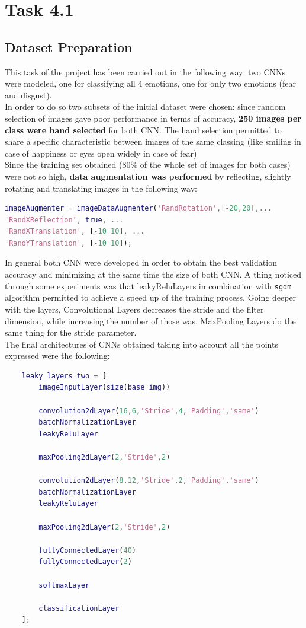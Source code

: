 \section{Task 4.1}
\subsection{Dataset Preparation}
This task of the project has been carried out in the following way: two CNNs were modeled, one for classifying all 4 emotions, one for only two emotions (fear and disgust).\\
In order to do so two subsets of the initial dataset were chosen: since random selection of images gave poor performance in terms of accuracy, \textbf{250 images per class were hand selected} for both CNN. The hand selection permitted to share a specific characteristic between images of the same classing (like smiling in case of happiness or eyes open widely in case of fear)\\
Since the training set obtained (80\% of the whole set of images for both cases) were not so high, \textbf{data augmentation was performed} by reflecting, slightly rotating and translating images in the following way:   

\begin{lstlisting}[language=Matlab]
%Method for image augmentation
imageAugmenter = imageDataAugmenter('RandRotation',[-20,20],...
'RandXReflection', true, ...
'RandXTranslation', [-10 10], ...
'RandYTranslation', [-10 10]);
\end{lstlisting}

In general both CNN were developed in order to obtain the best validation accuracy and minimizing at the same time the size of both CNN. A thing noticed through some experiments was that leakyReluLayers in combination with \verb|sgdm| algorithm permitted to achieve a speed up of the training process. Going deeper with the layers, Convolutional Layers decreases the stride and the filter dimension, while increasing the number of those was. MaxPooling Layers do the same thing for the stride parameter. \\
The final architectures of CNNs obtained taking into account all the points expressed were the following:

\begin{lstlisting}[language=Matlab] 
	%CNN layers for two-classes classification
	leaky_layers_two = [
		imageInputLayer(size(base_img))
		
		convolution2dLayer(16,6,'Stride',4,'Padding','same')
		batchNormalizationLayer
		leakyReluLayer
		
		maxPooling2dLayer(2,'Stride',2)
		
		convolution2dLayer(8,12,'Stride',2,'Padding','same')
		batchNormalizationLayer
		leakyReluLayer
		
		maxPooling2dLayer(2,'Stride',2)
		
		fullyConnectedLayer(40)
		fullyConnectedLayer(2)
		
		softmaxLayer
		
		classificationLayer
	];
\end{lstlisting} 

